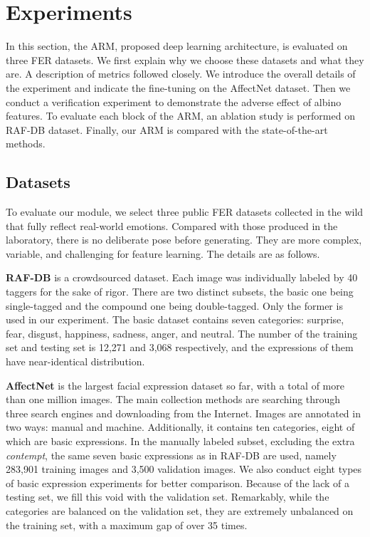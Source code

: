 \documentclass[10pt,twocolumn,letterpaper]{article}
\begin{document}
\section{Experiments}
	In this section, the ARM, proposed deep learning architecture, is evaluated on three FER datasets. We first explain why we choose these datasets and what they are. A description of metrics followed closely. We introduce the overall details of the experiment and indicate the fine-tuning on the AffectNet dataset. Then we conduct a verification experiment to demonstrate the adverse effect of albino features. To evaluate each block of the ARM, an ablation study is performed on RAF-DB dataset. Finally, our ARM is compared with the state-of-the-art methods.

\subsection{Datasets}
	To evaluate our module, we select three public FER datasets collected in the wild that fully reflect real-world emotions. Compared with those produced in the laboratory, there is no deliberate pose before generating. They are more complex, variable, and challenging for feature learning. The details are as follows.

	\textbf{RAF-DB} \cite{raf-db} is a crowdsourced dataset. Each image was individually labeled by 40 taggers for the sake of rigor. There are two distinct subsets, the basic one being single-tagged and the compound one being double-tagged. Only the former is used in our experiment. The basic dataset contains seven categories: surprise, fear, disgust, happiness, sadness, anger, and neutral. The number of the training set and testing set is 12,271 and 3,068 respectively, and the expressions of them have near-identical distribution. 

	\textbf{AffectNet} \cite{affectnet} is the largest facial expression dataset so far, with a total of more than one million images. The main collection methods are searching through three search engines and downloading from the Internet. Images are annotated in two ways: manual and machine. Additionally, it contains ten categories, eight of which are basic expressions. In the manually labeled subset, excluding the extra \emph{contempt}, the same seven basic expressions as in RAF-DB are used, namely 283,901 training images and 3,500 validation images. We also conduct eight types of basic expression experiments for better comparison. Because of the lack of a testing set, we fill this void with the validation set. Remarkably, while the categories are balanced on the validation set, they are extremely unbalanced on the training set, with a maximum gap of over 35 times. 
\end{document}
